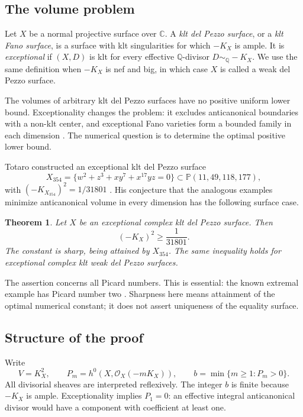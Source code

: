 \documentclass[12pt,a4paper]{article}
\numberwithin{equation}{section}
\newtheorem{theorem}{Theorem}[section]
\theoremstyle{definition}
\newcommand{\Q}{\mathbb Q}
\newcommand{\C}{\mathbb C}
\newcommand{\PP}{\mathbb P}
\newcommand{\OO}{\mathcal O}
\begin{document}
\subsection{The volume problem}

Let \(X\) be a normal projective surface over \(\C\). A \emph{klt del
Pezzo surface}, or a \emph{klt Fano surface}, is a surface with klt
singularities for which \(-K_X\) is ample. It is \emph{exceptional} if
\((X,D)\) is klt for every effective \(\Q\)-divisor
\(D\sim_{\Q}-K_X\). We use the same definition when \(-K_X\) is nef and
big, in which case \(X\) is called a weak del Pezzo surface.

The volumes of arbitrary klt del Pezzo surfaces have no positive
uniform lower bound. Exceptionality changes the problem: it excludes
anticanonical boundaries with a non-klt center, and exceptional Fano
varieties form a bounded family in each dimension \cite{Bir19}.
The numerical question is to determine the optimal positive lower
bound.

Totaro constructed an exceptional klt del Pezzo surface
\[
 X_{354}=\{w^2+z^3+xy^7+x^{17}yz=0\}
       \subset\PP(11,49,118,177),
\]
with \((-K_{X_{354}})^2=1/31801\)
\cite[Theorems 3.1 and 6.1]{Tot24}. His conjecture that the analogous
examples minimize anticanonical volume in every dimension has the
following surface case.

\begin{theorem}\label{thm:main}
Let \(X\) be an exceptional complex klt del Pezzo surface. Then
\[
                         (-K_X)^2\geq\frac1{31801}.
\]
The constant is sharp, being attained by \(X_{354}\).
The same inequality holds for exceptional complex klt weak del Pezzo
surfaces.
\end{theorem}

The assertion concerns all Picard numbers. This is essential: the
known extremal example has Picard number two \cite{Tot24}.
Sharpness here means attainment of the optimal numerical constant;
it does not assert uniqueness of the equality surface.

\subsection{Structure of the proof}

Write
\[
 V=K_X^2,\qquad
 P_m=h^0(X,\OO_X(-mK_X)),\qquad
 b=\min\{m\geq1:P_m>0\}.
\]
All divisorial sheaves are interpreted reflexively. The integer \(b\)
is finite because \(-K_X\) is ample. Exceptionality implies \(P_1=0\):
an effective integral anticanonical divisor would have a component
with coefficient at least one.
\end{document}
